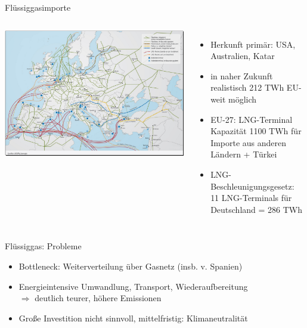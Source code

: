 \documentclass[10pt]{beamer}
\begin{document}
\begin{frame}{Flüssiggasimporte}

\addtolength{\leftmargini}{\labelsep}

\begin{columns}
\includegraphics[width=\textwidth]{fig/gasnetz-europa.png}
\scriptsize{}
\small{
\begin{itemize}
\item Herkunft primär: USA, Australien, Katar\footnotemark
\item in naher Zukunft realistisch 212 TWh EU-weit möglich\footnotemark
\item EU-27: LNG-Terminal Kapazität 1100 TWh für Importe aus anderen Ländern\footnotemark
  + Türkei\footnotemark
\item LNG-Beschleunigungsgesetz: 11 LNG-Terminals für Deutschland = 286 TWh\footnotemark
\end{itemize}
}
\end{columns}
\smallskip
{}
\end{frame}


\begin{frame}{Flüssiggas: Probleme}
  \begin{itemize}
\item Bottleneck: Weiterverteilung über Gasnetz (insb. v. Spanien) 
\item Energieintensive Umwandlung, Transport, Wiederaufbereitung 
  \\ $\Rightarrow$ deutlich teurer, höhere Emissionen 
\item Große Investition nicht sinnvoll, mittelfristig: Klimaneutralität
  \end{itemize}

\end{frame}
\end{document}
